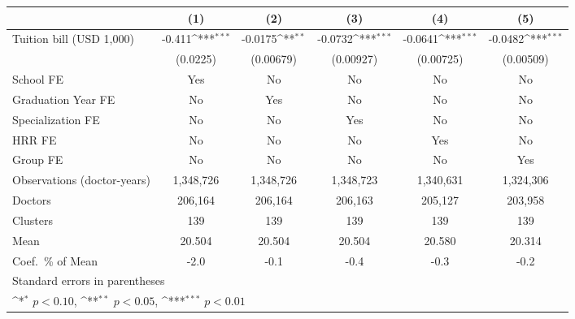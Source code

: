 {
\def\sym#1{\ifmmode^{#1}\else\(^{#1}\)\fi}
\begin{tabular}{l*{5}{c}}
\hline\hline
                    &\multicolumn{1}{c}{(1)}         &\multicolumn{1}{c}{(2)}         &\multicolumn{1}{c}{(3)}         &\multicolumn{1}{c}{(4)}         &\multicolumn{1}{c}{(5)}         \\
\hline
Tuition bill (USD 1,000)&      -0.411\sym{***}&     -0.0175\sym{**} &     -0.0732\sym{***}&     -0.0641\sym{***}&     -0.0482\sym{***}\\
                    &    (0.0225)         &   (0.00679)         &   (0.00927)         &   (0.00725)         &   (0.00509)         \\
[1em]
School FE           &         Yes         &          No         &          No         &          No         &          No         \\
[1em]
Graduation Year FE  &          No         &         Yes         &          No         &          No         &          No         \\
[1em]
Specialization FE   &          No         &          No         &         Yes         &          No         &          No         \\
[1em]
HRR FE              &          No         &          No         &          No         &         Yes         &          No         \\
[1em]
Group FE            &          No         &          No         &          No         &          No         &         Yes         \\
\hline
Observations (doctor-years)&   1,348,726         &   1,348,726         &   1,348,723         &   1,340,631         &   1,324,306         \\
Doctors             &     206,164         &     206,164         &     206,163         &     205,127         &     203,958         \\
Clusters            &         139         &         139         &         139         &         139         &         139         \\
Mean                &      20.504         &      20.504         &      20.504         &      20.580         &      20.314         \\
Coef.\ \% of Mean   &        -2.0         &        -0.1         &        -0.4         &        -0.3         &        -0.2         \\
\hline\hline
\multicolumn{6}{l}{\footnotesize Standard errors in parentheses}\\
\multicolumn{6}{l}{\footnotesize \sym{*} \(p<0.10\), \sym{**} \(p<0.05\), \sym{***} \(p<0.01\)}\\
\end{tabular}
}
